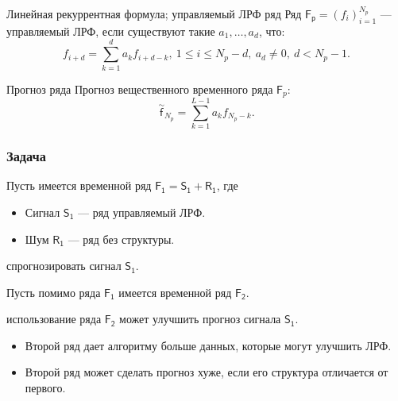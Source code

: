 \documentclass[ucs, notheorems, handout]{beamer}
\begin{document}
\begin{frame}
    \begin{block}{Линейная рекуррентная формула; управляемый ЛРФ ряд}
        Ряд $\mathsf{F_p} = (f_i)_{i=1}^{N_p}$ --- управляемый ЛРФ, если существуют такие $a_1, \dotso, a_d$, что:
        $$f_{i+d} = \sum_{k=1}^d a_k f_{i+d-k},\ 1 \leq i \leq N_p - d,\ a_d \neq 0,\ d < N_p - 1.$$
    \end{block}

    
    \begin{block}{Прогноз ряда}
        Прогноз вещественного временного ряда $\mathsf{F}_p$:
        $$\overset{\sim}{\mathsf{f}}_{N_p} = \sum_{k=1}^{L-1} a_k f_{N_p-k}.$$
    \end{block}

\end{frame}

\begin{frame}
    \frametitle{Задача}

    Пусть имеется временной ряд $\mathsf{F_1 = S_1 + R_1}$, где
    \begin{itemize}
        \item Сигнал $\mathsf{S_1}$ --- ряд управляемый ЛРФ.
        \item Шум $\mathsf{R_1}$ --- ряд без структуры.
    \end{itemize} 

    спрогнозировать сигнал $\mathsf{S_1}$.

    Пусть помимо ряда $\mathsf{F_1}$ имеется временной ряд $\mathsf{F_2}$.

    использование ряда $\mathsf{F_2}$ может улучшить прогноз сигнала $\mathsf{S_1}$.

    \begin{itemize}
        \item Второй ряд дает алгоритму больше данных, которые могут улучшить ЛРФ.
        \item Второй ряд может сделать прогноз хуже, если его структура отличается от первого.
    \end{itemize}
\end{frame}
\end{document}
